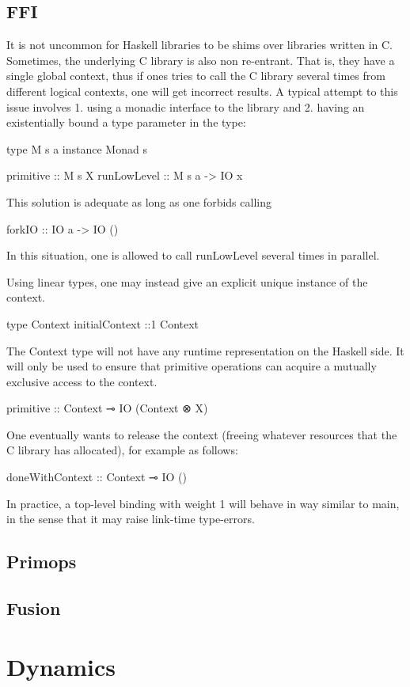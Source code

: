 \documentclass[11pt]{article}
\begin{document}
\subsection{FFI}
\label{sec:ffi}

It is not uncommon for Haskell libraries to be shims over libraries
written in C. Sometimes, the underlying C library is also non
re-entrant. That is, they have a single global context, thus if ones
tries to call the C library several times from different logical
contexts, one will get incorrect results. A typical attempt to this
issue involves
1. using a monadic interface to the library and
2. having an existentially bound a type parameter in the type:

type M s a
instance Monad s

primitive :: M s X
runLowLevel :: M s a -> IO x

This solution is adequate as long as one forbids calling

forkIO :: IO a -> IO ()

In this situation, one is allowed to call runLowLevel several times in
parallel.

Using linear types, one may instead give an explicit unique instance
of the context.

type Context
initialContext ::1 Context

The Context type will not have any runtime representation on the
Haskell side.  It will only be used to ensure that primitive
operations can acquire a mutually exclusive access to the context.

primitive :: Context ⊸ IO (Context ⊗ X)

One eventually wants to release the context (freeing whatever
resources that the C library has allocated), for example as follows:

doneWithContext :: Context ⊸ IO ()

In practice, a top-level binding with weight 1 will behave in way
similar to main, in the sense that it may raise link-time type-errors.
\subsection{Primops}

\subsection{Fusion}
\label{sec:fusion}

\section{Dynamics}
\label{sec:orgheadline16}
\end{document}

